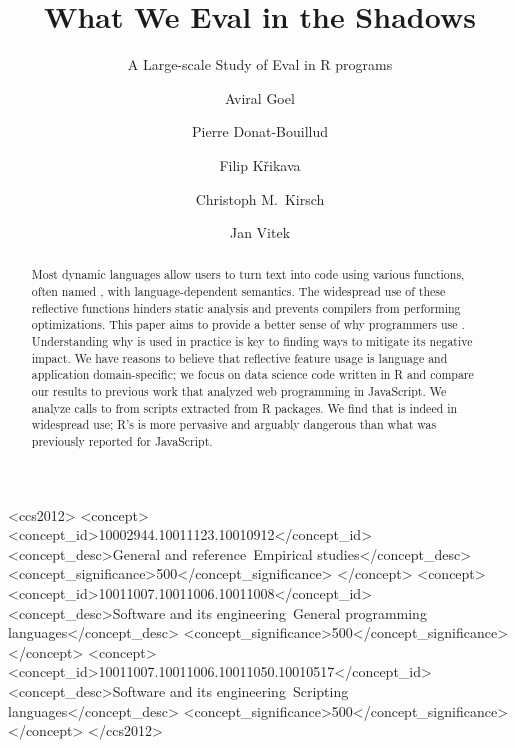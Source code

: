 \documentclass[acmsmall, screen]{acmart}
\begin{document}
\title{What We Eval in the Shadows}
\subtitle{A Large-scale Study of Eval in R programs}

\begin{CCSXML}
<ccs2012>
<concept>
<concept_id>10002944.10011123.10010912</concept_id>
<concept_desc>General and reference~Empirical studies</concept_desc>
<concept_significance>500</concept_significance>
</concept>
<concept>
<concept_id>10011007.10011006.10011008</concept_id>
<concept_desc>Software and its engineering~General programming languages</concept_desc>
<concept_significance>500</concept_significance>
</concept>
<concept>
<concept_id>10011007.10011006.10011050.10010517</concept_id>
<concept_desc>Software and its engineering~Scripting languages</concept_desc>
<concept_significance>500</concept_significance>
</concept>
</ccs2012>
\end{CCSXML}


\author{Aviral Goel}
\author{Pierre Donat-Bouillud}
\author{Filip Křikava}
\author{Christoph M.~Kirsch}
\author{Jan Vitek}

\begin{abstract}
  Most dynamic languages allow users to turn text into code using various
  functions, often named \eval, with language-dependent semantics. The
  widespread use of these reflective functions hinders static analysis and
  prevents compilers from performing optimizations. This paper aims to provide a
  better sense of why programmers use \eval. Understanding why \eval is used in
  practice is key to finding ways to mitigate its negative impact. We have
  reasons to believe that reflective feature usage is language and application
  domain-specific; we focus on data science code written in R and compare our
  results to previous work that analyzed web programming in JavaScript. We
  analyze \packageAllcalls calls to \eval from \CranRunnableScripts scripts
  extracted from \CranPackages R packages. We find that \eval is indeed in
  widespread use; R's \eval is more pervasive and arguably dangerous than what
  was previously reported for JavaScript.
\end{abstract}
\end{document}
